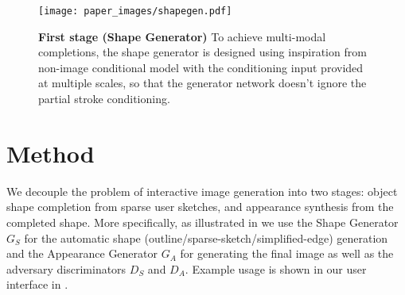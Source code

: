 \begin{figure*}[t]
	\centering
	\texttt{[image: paper\_images/shapegen.pdf]}
	\vspace{-8mm}
	\caption{\textbf{First stage (Shape Generator)} To achieve multi-modal completions, the shape generator is designed using inspiration from non-image conditional model \cite{mescheder2018training} with the conditioning input provided at multiple scales, so that the generator network doesn't ignore the partial stroke conditioning.
	}\label{fig:SketchNet}
\end{figure*}

\label{sec:methods}

\vspace{-4mm}
\section{Method}
We decouple the problem of interactive image generation into two stages: object shape completion from sparse user sketches, and appearance synthesis from the completed shape. More specifically, as illustrated in  we use the Shape Generator $G_S$ for the automatic shape (outline/sparse-sketch/simplified-edge) generation and the Appearance Generator $G_A$ for generating the final image as well as the adversary discriminators $D_S$ and $D_A$. Example usage is shown in our user interface in .

